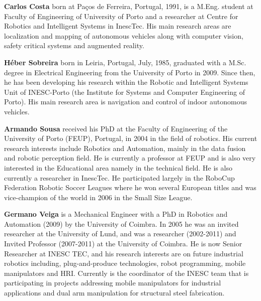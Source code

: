 \textbf{Carlos Costa} born at Paços de Ferreira, Portugal, 1991, is a M.Eng. student at Faculty of Engineering of University of Porto and a researcher at Centre for Robotics and Intelligent Systems in InescTec. His main research areas are localization and mapping of autonomous vehicles along with computer vision, safety critical systems and augmented reality.

\textbf{Héber Sobreira} born in  Leiria, Portugal, July, 1985, graduated with a M.Sc. degree in Electrical Engineering from the University of Porto in 2009. Since then, he has been developing his research within the Robotic and Intelligent Systems Unit of INESC-Porto (the Institute for Systems and Computer Engineering of Porto). His main research area is navigation and control of indoor autonomous vehicles.

\textbf{Armando Sousa} received his PhD at the Faculty of Engineering of the University of Porto (FEUP), Portugal, in 2004 in the field of robotics. His current research interests include Robotics and Automation, mainly in the data fusion and robotic perception field. He is currently a professor at FEUP and is also very interested in the Educational area namely in the technical field. He is also currently a researcher in InescTec. He participated largely in the RoboCup Federation Robotic Soccer Leagues where he won several European titles and was vice-champion of the world in 2006 in the Small Size League.

\textbf{Germano Veiga} is a Mechanical Engineer with a PhD in Robotics and Automation (2009) by the University of Coimbra. In 2005 he was an invited researcher at the University of Lund, and was a researcher (2002-2011) and Invited Professor (2007-2011) at the University of Coimbra. He is now Senior Researcher at INESC TEC, and his research interests are on future industrial robotics including, plug-and-produce technologies, robot programming, mobile manipulators and HRI. Currently is the coordinator of the INESC team that is participating in projects addressing mobile manipulators for industrial applications and dual arm manipulation for structural steel fabrication.
